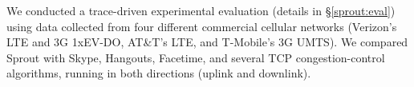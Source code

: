 






We conducted a trace-driven experimental evaluation (details in
\S\ref{sprout:eval}) using data collected from four different commercial
cellular networks (Verizon's LTE and 3G 1xEV-DO, AT\&T's LTE, and
T-Mobile's 3G UMTS). We compared Sprout with Skype, Hangouts, Facetime,
and several TCP congestion-control algorithms, running in both
directions (uplink and downlink).

